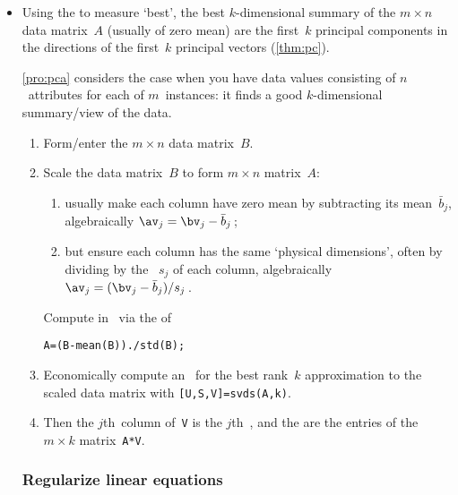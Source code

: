 \begin{itemize}
\item Using the  to measure `best', the best \(k\)-dimensional summary of the \(m\times n\) data matrix~\(A\) (usually of zero mean) are the first~\(k\) principal components in the directions of the first~\(k\) principal vectors (\cref{thm:pc}).

\itemme  
\cref{pro:pca} considers the case when you have data values consisting of \(n\)~attributes for each of \(m\)~instances: it finds a good \(k\)-dimensional summary\slash view of the data. 
\begin{enumerate} \sloppy
\item Form\slash enter the \(m\times n\) data matrix~\(B\).
\item {}Scale the data matrix~\(B\) to form \(m\times n\) matrix~\(A\):
\begin{enumerate}
\item usually make each column have zero mean by subtracting its mean~\(\bar b_j\), algebraically \(\av_j=\bv_j-\bar b_j\)\,;
\item but ensure each column has the same `physical dimensions', often by dividing by the ~\(s_j\) of each column, algebraically \(\av_j=(\bv_j-\bar b_j)/s_j\)\,.
\end{enumerate}
Compute in \script\ via the  of
\begin{verbatim}
A=(B-mean(B))./std(B);
\end{verbatim}
\item  Economically compute an \svd\ for the best rank~\(k\) approximation to the scaled data matrix with \verb|[U,S,V]=svds(A,k)|.
\item Then the \(j\)th~column of~\verb|V| is the \(j\)th~, and the  are the entries of the \(m\times k\) matrix~\verb|A*V|.
\end{enumerate}




\subsubsection*{Regularize linear equations}


\end{itemize}
